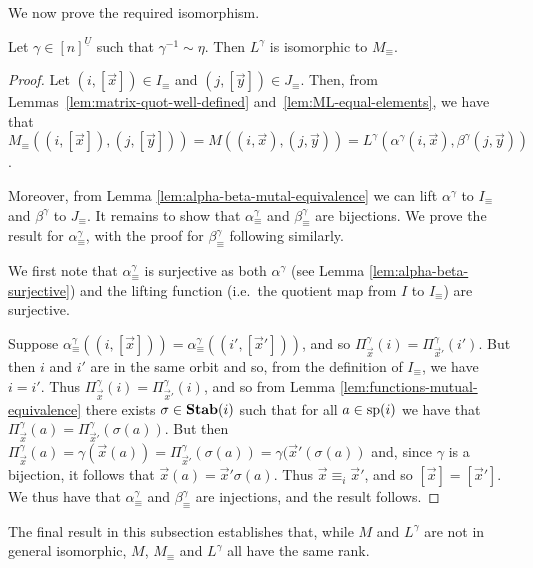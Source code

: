 \documentclass[../main/thesis.tex]{subfiles}
\begin{document}
We now prove the required isomorphism.

\begin{thm}
	Let $\gamma \in [n]^{\underline{U}}$ such that $\gamma^{-1} \sim \eta$. Then
  $L^{\gamma}$ is isomorphic to $M_{\equiv}$.
	\label{thm:LM-equivalence}
\end{thm}
\begin{proof}
	Let $(i, [\vec{x}]) \in I_\equiv$ and $(j, [\vec{y}]) \in J_\equiv$. Then,
  from Lemmas~\ref{lem:matrix-quot-well-defined}
  and~\ref{lem:ML-equal-elements}, we have that $M_\equiv ((i, [\vec{x}]), (j,
  [\vec{y}])) = M ((i, \vec{x}), (j, \vec{y})) = L^{\gamma}(\alpha^{\gamma}(i,
  \vec{x}), \beta^{\gamma}(j, \vec{y}))$.
		
	Moreover, from Lemma \ref{lem:alpha-beta-mutal-equivalence} we can lift
  $\alpha^\gamma$ to $I_\equiv$ and $\beta^{\gamma}$ to $J_\equiv$. It remains
  to show that $\alpha^\gamma_{\equiv}$ and $\beta^{\gamma}_{\equiv}$ are
  bijections. We prove the result for $\alpha^{\gamma}_{\equiv}$, with the proof
  for $\beta^\gamma_\equiv$ following similarly.
		
	We first note that $\alpha^{\gamma}_{\equiv}$ is surjective as both
  $\alpha^{\gamma}$ (see Lemma \ref{lem:alpha-beta-surjective}) and the lifting
  function (i.e.\ the quotient map from $I$ to $I_\equiv$) are surjective.
		
	Suppose $\alpha^{\gamma}_\equiv((i, [\vec{x}])) = \alpha^{\gamma}_\equiv((i',
  [\vec{x}']))$, and so $\Pi^{\gamma}_{\vec{x}}(i) =
  \Pi^{\gamma}_{\vec{x}'}(i')$. But then $i$ and $i'$ are in the same orbit and
  so, from the definition of $I_{\equiv}$, we have $i = i'$. Thus
  $\Pi^{\gamma}_{\vec{x}}(i) = \Pi^{\gamma}_{\vec{x}'}(i)$, and so from Lemma
  \ref{lem:functions-mutual-equivalence} there exists $\sigma \in \text{\textbf{Stab}}(i)$ such
  that for all $a \in \text{sp}(i)$ we have that $\Pi^{\gamma}_{\vec{x}}(a) =
  \Pi^{\gamma}_{\vec{x}'} (\sigma (a))$. But then $\Pi^{\gamma}_{\vec{x}}(a) =
  \gamma (\vec{x}(a)) = \Pi^{\gamma}_{\vec{x}'}(\sigma (a)) = \gamma (\vec{x}'
  (\sigma (a))$ and, since $\gamma$ is a bijection, it follows that $\vec{x}(a)
  = \vec{x}' \sigma (a)$. Thus $\vec{x} \equiv_i \vec{x}'$, and so $[\vec{x}] =
  [\vec{x}']$. We thus have that $\alpha^{\gamma}_\equiv$ and
  $\beta^{\gamma}_\equiv$ are injections, and the result follows.
\end{proof}

The final result in this subsection establishes that, while $M$ and $L^{\gamma}$
are not in general isomorphic, $M$, $M_\equiv$ and $L^{\gamma}$ all have the
same rank.
\end{document}
